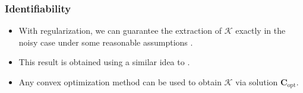 \documentclass[10pt,xcolor={usenames,dvipsnames,table}]{beamer}
\def\blue{\color{blue}}
\newcommand{\norm}[1]{\left\lVert#1\right\rVert}
\newcommand{\citep}[1]{{\blue \scriptsize \parencite{#1}}}
\begin{document}
\begin{frame}[label=fine]
    \frametitle{Identifiability}

    \begin{itemize}
        \item With regularization, we can guarantee the extraction of $\mathcal{K}$ exactly in the noisy case under some reasonable assumptions \citep{nguyen2021memory}. 
        \item This result is obtained using a similar idea to \citep{fu2015robust}.
        \item Any convex optimization method can be used to obtain $\mathcal{K}$ via solution $\bm{C}_{\text{opt}}$.
    \end{itemize}


\end{frame}
\end{document}
